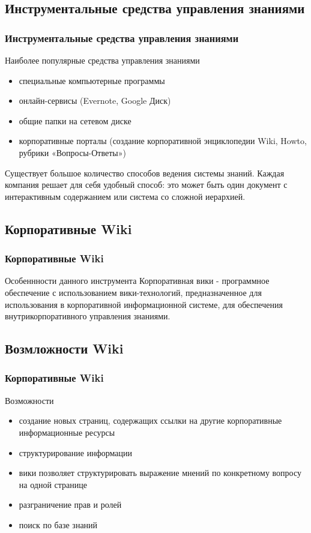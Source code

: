 \documentclass{../industrial-development}
\begin{document}
\subsection{Инструментальные средства управления знаниями}
\begin{frame} \frametitle{Инструментальные средства управления знаниями}
  \begin{block}{Наиболее популярные средства управления знаниями}
  \end{block}
  
  \begin{itemize}
  \item специальные компьютерные программы
  \item онлайн-сервисы (Evernote, Google Диск)
  \item общие папки на сетевом диске
  \item корпоративные порталы (создание корпоративной энциклопедии Wiki, Howto, рубрики «Вопросы-Ответы»)
  \end{itemize}
\end{frame}

\lecturenotes
 Существует большое количество способов ведения системы знаний. Каждая компания решает для себя удобный способ: это может быть один документ с интерактивным содержанием или система со сложной иерархией.

\subsection{Корпоративные Wiki}
\begin{frame} \frametitle{Корпоративные Wiki}
  \begin{block}{Особеннности данного инструмента}
 Корпоративная вики - программное обеспечение с использованием вики-технологий, предназначенное для использования в корпоративной информационной системе, для обеспечения внутрикорпоративного управления знаниями.
  \end{block}
\end{frame}

\subsection{Возмложности Wiki}
\begin{frame} \frametitle{Корпоративные Wiki}
  \begin{block}{Возможности}
   \end{block}
  
  \begin{itemize}
  \item создание новых страниц, содержащих ссылки на другие корпоративные информационные ресурсы
  \item структурирование информации 
  \item вики позволяет структурировать выражение мнений по конкретному вопросу на одной странице
  \item разграничение прав и ролей
  \item поиск по базе знаний
  \end{itemize}
\end{frame}
\end{document}
